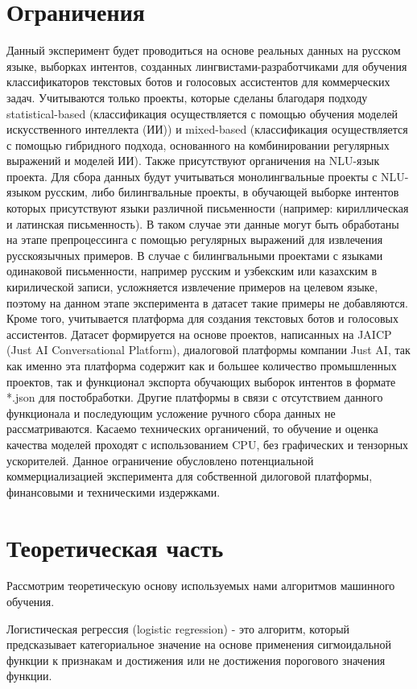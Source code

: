 \documentclass{article}
\begin{document}
\section{Ограничения}
Данный эксперимент будет проводиться на основе реальных данных на русском языке, выборках интентов, созданных лингвистами-разработчиками для обучения классификаторов текстовых ботов и голосовых ассистентов для коммерческих задач. Учитываются только проекты, которые сделаны благодаря подходу statistical-based (классификация осуществляется с помощью обучения моделей искусственного интеллекта (ИИ)) и mixed-based (классификация осуществляется с помощью гибридного подхода, основанного на комбинировании регулярных выражений и моделей ИИ). Также присутствуют органичения на NLU-язык проекта. Для сбора данных будут учитываться монолингвальные проекты с NLU-языком русским, либо билингвальные проекты, в обучающей выборке интентов которых присутствуют языки различной письменности (например: кириллическая и латинская письменность). В таком случае эти данные могут быть обработаны на этапе препроцессинга с помощью регулярных выражений для извлечения русскоязычных примеров. В случае с билингвальными проектами с языками одинаковой письменности, например русским и узбекским или казахским в кирилической записи, усложняется извлечение примеров на целевом языке, поэтому на данном этапе эксперимента в датасет такие примеры не добавляются. 
Кроме того, учитывается платформа для создания текстовых ботов и голосовых ассистентов. Датасет формируется на основе проектов, написанных на JAICP (Just AI Conversational Platform), диалоговой платформы компании Just AI, так как именно эта платформа содержит как и большее количество промышленных проектов, так и функционал экспорта обучающих выборок интентов в формате *.json для постобработки. Другие платформы в связи с отсутствием данного функционала и последующим усложение ручного сбора данных не рассматриваются. 
Касаемо технических органичений, то обучение и оценка качества моделей проходят с использованием CPU, без графических и тензорных ускорителей. Данное ограничение обусловлено потенциальной коммерциализацией эксперимента для собственной дилоговой платформы, финансовыми и техническими издержками.

\section{Теоретическая часть}
Рассмотрим теоретическую основу используемых нами алгоритмов машинного обучения.

Логистическая регрессия (logistic regression) - это алгоритм, который предсказывает категориальное значение на основе применения сигмоидальной функции к признакам и достижения или не достижения порогового значения функции.
\end{document}
